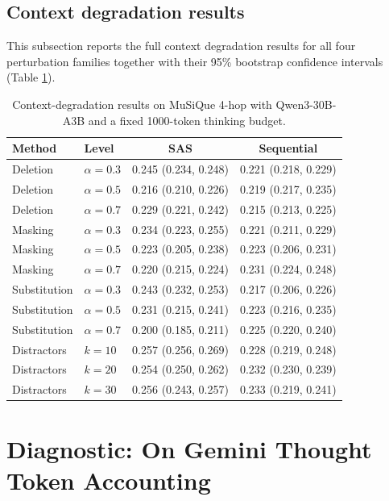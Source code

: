 \documentclass{article} %
\begin{document}
\subsection{Context degradation results}
This subsection reports the full context degradation results for all four perturbation families together with their 95\% bootstrap confidence intervals (Table \ref{tab:appendix-context-degradation}).

\begin{table}[t]
\centering
\caption{Context-degradation results on MuSiQue 4-hop with Qwen3-30B-A3B and a fixed 1000-token thinking budget.}
\label{tab:appendix-context-degradation}
\begin{tabular}{llcc}
\toprule
Method & Level & SAS & Sequential \\
\midrule
Deletion & $\alpha = 0.3$ & 0.245 (0.234, 0.248) & 0.221 (0.218, 0.229) \\
Deletion & $\alpha = 0.5$ & 0.216 (0.210, 0.226) & 0.219 (0.217, 0.235) \\
Deletion & $\alpha = 0.7$ & 0.229 (0.221, 0.242) & 0.215 (0.213, 0.225) \\
\midrule
Masking & $\alpha = 0.3$ & 0.234 (0.223, 0.255) & 0.221 (0.211, 0.229) \\
Masking & $\alpha = 0.5$ & 0.223 (0.205, 0.238) & 0.223 (0.206, 0.231) \\
Masking & $\alpha = 0.7$ & 0.220 (0.215, 0.224) & 0.231 (0.224, 0.248) \\
\midrule
Substitution & $\alpha = 0.3$ & 0.243 (0.232, 0.253) & 0.217 (0.206, 0.226) \\
Substitution & $\alpha = 0.5$ & 0.231 (0.215, 0.241) & 0.223 (0.216, 0.235) \\
Substitution & $\alpha = 0.7$ & 0.200 (0.185, 0.211) & 0.225 (0.220, 0.240) \\
\midrule
Distractors & $k = 10$ & 0.257 (0.256, 0.269) & 0.228 (0.219, 0.248) \\
Distractors & $k = 20$ & 0.254 (0.250, 0.262) & 0.232 (0.230, 0.239) \\
Distractors & $k = 30$ & 0.256 (0.243, 0.257) & 0.233 (0.219, 0.241) \\
\bottomrule
\end{tabular}
\end{table}

\section{Diagnostic: On Gemini Thought Token Accounting}
\label{appendix:gemini_accounting}
\end{document}
